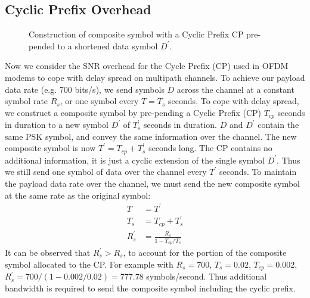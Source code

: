 \documentclass{article}
\begin{document}
\subsection{Cyclic Prefix Overhead}

\begin{figure}[h]
\caption{Construction of composite symbol with a Cyclic Prefix CP pre-pended to a shortened data symbol $D^\prime$.}
\vspace{5mm}
\label{fig:composite_symbol}
\centering
{}
\end{figure}

Now we consider the SNR overhead for the Cycle Prefix (CP) used in OFDM modems to cope with delay spread on multipath channels.  To achieve our payload data rate (e.g. 700 bits/s), we send symbols $D$ across the channel at a constant symbol rate $R_s$, or one symbol every $T=T_s$ seconds.  To cope with delay spread, we construct a composite symbol by pre-pending a Cyclic Prefix (CP) $T_{cp}$ seconds in duration to a new symbol $D^\prime$ of $T^\prime_s$ seconds in duration.  $D$ and $D^\prime$ contain the same PSK symbol, and convey the same information over the channel. The new composite symbol is now $T^\prime = T_{cp}+T^\prime_s$ seconds long.  The CP contains no additional information, it is just a cyclic extension of the single symbol $D^\prime$. Thus we still send one symbol of data over the channel every $T^\prime$ seconds.  To maintain the payload data rate over the channel, we must send the new composite symbol at the same rate as the original symbol:
\begin{equation}
\begin{split}
T &= T^\prime \\
T_s &= T_{cp} + T^\prime_s \\
R^\prime_s &= \frac{R_s}{1 - T_{cp}/T_s}
\end{split}
\end{equation}
It can be observed that $R^\prime_s > R_s$, to account for the portion of the composite symbol allocated to the CP.  For example with $R_s=700$, $T_s=0.02$, $T_{cp}=0.002$, $R^\prime_s=700/(1-0.002/0.02)=777.78$ symbols/second.  Thus additional bandwidth is required to send the composite symbol including the cyclic prefix.
\end{document}
